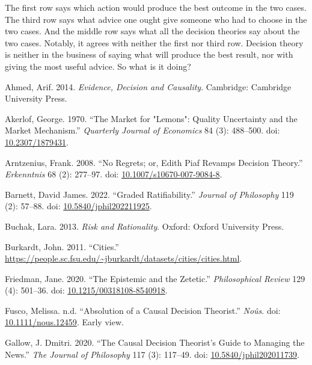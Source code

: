 \documentclass[
  11pt,
  letterpaper,
  DIV=11,
  numbers=noendperiod,
  twoside]{scrartcl}
\newlength{\cslhangindent}
\newenvironment{CSLReferences}[2] %
 {\begin{list}{}{%
  \setlength{\itemindent}{0pt}
  \setlength{\leftmargin}{0pt}
  \setlength{\parsep}{0pt}
  \ifodd #1
   \setlength{\leftmargin}{\cslhangindent}
   \setlength{\itemindent}{-1\cslhangindent}
  \fi
  \setlength{\itemsep}{#2\baselineskip}}}
 {\end{list}}
\begin{document}
The first row says which action would produce the best outcome in the
two cases. The third row says what advice one ought give someone who had
to choose in the two cases. And the middle row says what all the
decision theories say about the two cases. Notably, it agrees with
neither the first nor third row. Decision theory is neither in the
business of saying what will produce the best result, nor with giving
the most useful advice. So what is it doing?

\label{refs}
\begin{CSLReferences}{1}{0}
Ahmed, Arif. 2014. \emph{Evidence, Decision and Causality}. Cambridge:
{C}ambridge {U}niversity {P}ress.

Akerlof, George. 1970. {``The Market for "Lemons": Quality Uncertainty
and the Market Mechanism.''} \emph{Quarterly Journal of Economics} 84
(3): 488--500. doi:
\href{https://doi.org/10.2307/1879431}{10.2307/1879431}.

Arntzenius, Frank. 2008. {``No Regrets; or, Edith Piaf Revamps Decision
Theory.''} \emph{Erkenntnis} 68 (2): 277--97. doi:
\href{https://doi.org/10.1007/s10670-007-9084-8}{10.1007/s10670-007-9084-8}.

Barnett, David James. 2022. {``Graded Ratifiability.''} \emph{Journal of
Philosophy} 119 (2): 57--88. doi:
\href{https://doi.org/10.5840/jphil202211925}{10.5840/jphil202211925}.

Buchak, Lara. 2013. \emph{Risk and Rationality}. Oxford: Oxford
University Press.

Burkardt, John. 2011. {``Cities.''}
\url{https://people.sc.fsu.edu/~jburkardt/datasets/cities/cities.html}.

Friedman, Jane. 2020. {``The Epistemic and the Zetetic.''}
\emph{Philosophical Review} 129 (4): 501--36. doi:
\href{https://doi.org/10.1215/00318108-8540918}{10.1215/00318108-8540918}.

Fusco, Melissa. n.d. {``Absolution of a Causal Decision Theorist.''}
\emph{No{û}s}. doi:
\href{https://doi.org/10.1111/nous.12459}{10.1111/nous.12459}. Early
view.

Gallow, J. Dmitri. 2020. {``The Causal Decision Theorist's Guide to
Managing the News.''} \emph{The Journal of Philosophy} 117 (3): 117--49.
doi:
\href{https://doi.org/10.5840/jphil202011739}{10.5840/jphil202011739}.


\end{CSLReferences}
\end{document}

